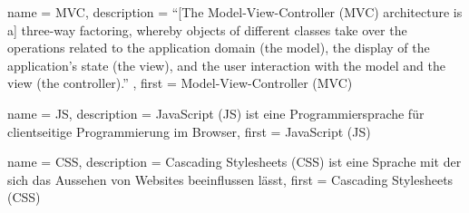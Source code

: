 






{
  name        = MVC,
  description = {"`[The Model-View-Controller (MVC) architecture is a] three-way factoring, whereby objects of different classes take over the operations related to the application domain (the model), the display of the application's state (the view), and the user interaction with the model and the view (the controller)."' \cite[vgl.][S.~1]{mvc}},
  first       = {Model-View-Controller (MVC)}
}


{
  name        = JS,
  description = {JavaScript (JS) ist eine Programmiersprache für clientseitige Programmierung im Browser},
  first       = {JavaScript (JS)}
}


{
  name        = CSS,
  description = {Cascading Stylesheets (CSS) ist eine Sprache mit der sich das Aussehen von Websites beeinflussen lässt},
  first       = {Cascading Stylesheets (CSS)}
}